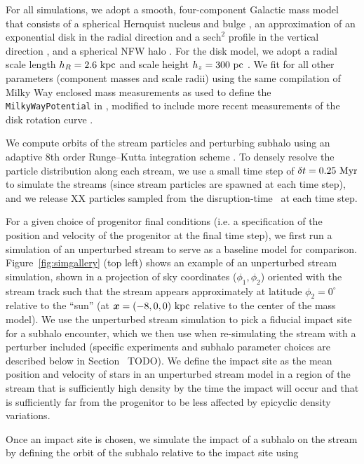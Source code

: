 For all simulations, we adopt a smooth, four-component Galactic mass model that consists
of a spherical Hernquist nucleus and bulge \citep{Hernquist:1992}, an approximation of
an exponential disk in the radial direction and a $\textrm{sech}^2$ profile in the
vertical direction \citep{Smith:2015}, and a spherical NFW halo \citep{Navarro:1996}.
For the disk model, we adopt a radial scale length $h_R = 2.6~\mathrm{kpc}$ and scale height
$h_z = 300~\mathrm{pc}$ \citep{Bland-Hawthorn:2016}.
We fit for all other parameters (component masses and scale radii) using the same
compilation of Milky Way enclosed mass measurements as used to define the
\texttt{MilkyWayPotential} in \gala \citep{gala}, modified to include more recent
measurements of the disk rotation curve \citep{Eilers:2019}.

We compute orbits of the stream particles and perturbing subhalo using an adaptive 8th
order Runge--Kutta integration scheme \citep{Hairer:1991}.
To densely resolve the particle distribution along each stream, we use a small time step
of $\delta t = 0.25~\mathrm{Myr}$ to simulate the streams (since stream particles are spawned at
each time step), and we release {\color{red} XX} particles sampled from the
disruption-time \df\ at each time step.

For a given choice of progenitor final conditions (i.e. a specification of the position
and velocity of the progenitor at the final time step), we first run a simulation of an
unperturbed stream to serve as a baseline model for comparison.
Figure~\ref{fig:simgallery} (top left) shows an example of an unperturbed stream
simulation, shown in a projection of sky coordinates ($\phi_1, \phi_2$) oriented with
the stream track such that the stream appears approximately at latitude $\phi_2=0^\circ$
relative to the ``sun'' (at $\boldsymbol{x} = (-8, 0, 0)~\mathrm{kpc}$ relative to the center of the
mass model).
We use the unperturbed stream simulation to pick a fiducial impact site for a subhalo
encounter, which we then use when re-simulating the stream with a perturber included
(specific experiments and subhalo parameter choices are described below in
Section~{\color{red} TODO}).
We define the impact site as the mean position and velocity of stars in an unperturbed
stream model in a region of the stream that is sufficiently high density by the time
the impact will occur and that is sufficiently far from the progenitor to be less
affected by epicyclic density variations.

Once an impact site is chosen, we simulate the impact of a subhalo on the stream by defining the orbit of the subhalo relative to the impact site using

